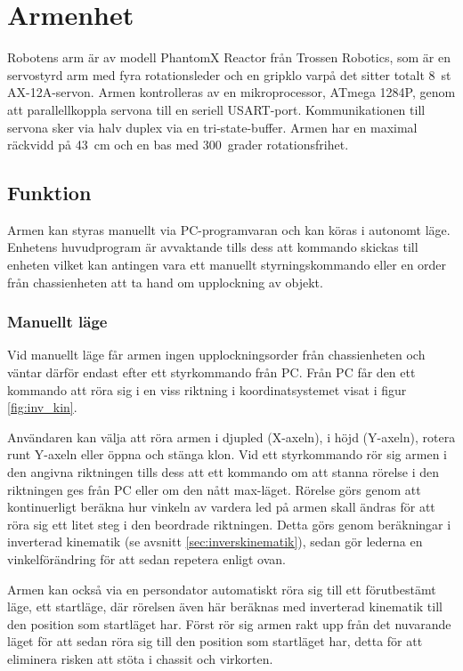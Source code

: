 \section{Armenhet}


Robotens arm är av modell PhantomX Reactor från Trossen Robotics, som är en servostyrd arm med fyra rotationsleder och en gripklo varpå det sitter totalt 8~st AX-12A-servon. Armen kontrolleras av en mikroprocessor, ATmega 1284P, genom att parallellkoppla servona till en seriell USART-port. Kommunikationen till servona sker via halv duplex via en tri-state-buffer. Armen har en maximal räckvidd på 43~cm och en bas med  300~grader rotationsfrihet.


\subsection{Funktion}

Armen kan styras manuellt via PC-programvaran och kan köras i autonomt läge. Enhetens huvudprogram är avvaktande tills dess att kommando skickas till enheten vilket kan antingen vara ett manuellt styrningskommando eller en order från chassienheten att ta hand om upplockning av objekt.

\subsubsection{Manuellt läge} 

Vid manuellt läge får armen ingen upplockningsorder från chassienheten och väntar därför endast efter ett styrkommando från PC. Från PC får den ett kommando att röra sig i en viss riktning i koordinatsystemet visat i figur \ref{fig:inv_kin}.

Användaren kan välja att röra armen i djupled (X-axeln), i höjd (Y-axeln), rotera runt Y-axeln eller öppna och stänga klon. Vid ett styrkommando rör sig armen i den angivna riktningen tills dess att ett kommando om att stanna rörelse i den riktningen ges från PC eller om den nått max-läget. Rörelse görs genom att kontinuerligt beräkna hur vinkeln av vardera led på armen skall ändras för att röra sig ett litet steg i den beordrade riktningen. Detta görs genom beräkningar i inverterad kinematik (se avsnitt \ref{sec:inverskinematik}), sedan gör lederna en vinkelförändring för att sedan repetera enligt ovan.

Armen kan också via en persondator automatiskt röra sig till ett förutbestämt läge, ett startläge, där rörelsen även här beräknas med inverterad kinematik till den position som startläget har. Först rör sig armen rakt upp från det nuvarande läget för att sedan röra sig till den position som startläget har, detta för att eliminera risken att stöta i chassit och virkorten.

